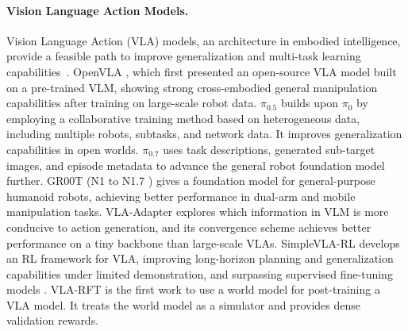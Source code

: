 \paragraph{Vision Language Action Models.}\label{sec:vlas}
Vision Language Action (VLA) models, an architecture in embodied intelligence, provide a feasible path to improve generalization and multi-task learning capabilities~\citep{manipulation_survey, bai2026latentreasoningvla,lyu2026general,lyu2026last,liu2026pi_0}. OpenVLA \citep{OpenVLA}, which first presented an open-source VLA model built on a pre-trained VLM, showing strong cross-embodied general manipulation capabilities after training on large-scale robot data. 
$\pi_{0.5}$ \citep{pi0.5} builds upon $\pi_{0}$ \citep{pi0} by employing a collaborative training method based on heterogeneous data, including multiple robots, subtasks, and network data. It improves generalization capabilities in open worlds. $\pi_{0.7}$ \citep{pi0.7} uses task descriptions, generated sub-target images, and episode metadata to advance the general robot foundation model further. GR00T (N1 \citep{GR00TN1} to N1.7 \citep{GR00TN1.7}) gives a foundation model for general-purpose humanoid robots, achieving better performance in dual-arm and mobile manipulation tasks. VLA-Adapter \citep{VLA-Adapter} explores which information in VLM is more conducive to action generation, and its convergence scheme achieves better performance on a tiny backbone than large-scale VLAs. SimpleVLA-RL \citep{SimpleVLA-RL} develops an RL framework for VLA, improving long-horizon planning and generalization capabilities under limited demonstration, and surpassing supervised fine-tuning models \citep{han2026dexhil}. VLA-RFT \citep{VLA-RFT} is the first work to use a world model for post-training a VLA model. It treats the world model as a simulator and provides dense validation rewards.


\vspace{-0.5em}
